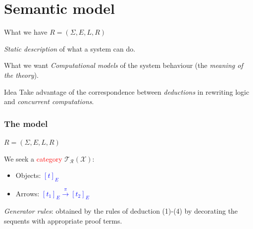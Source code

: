 \documentclass{beamer}
\begin{document}
\section{Semantic model}
\begin{frame}
    \begin{block}{What we have}
    $ R = (\Sigma, E, L, R)$

    \emph{Static description} of what a system can do.
        
    \end{block}
    
    \pause

    \begin{block}{What we want}
        \emph{Computational models} of the system behaviour (the \emph{meaning of the theory}).
    \end{block}

    \pause

    \begin{block}{Idea}
        Take advantage of the correspondence between  \emph{deductions} in rewriting logic 
        and \emph{concurrent computations}.
    \end{block}
\end{frame}
\begin{frame}
    \frametitle{The model }
    $
    R = (\Sigma, E, L, R)
    $

    \pause 
    \bigskip
    We seek a \textcolor{red}{category} $\mathcal{T_R(X)}$:\begin{itemize}
        \item Objects: \textcolor{blue}{$[t]_E$}
        \item Arrows: \textcolor{blue}{$[t_1]_E \xrightarrow{\pi} [t_2]_E$}
    \end{itemize}

    \pause 
    \bigskip
    \emph{Generator rules}: obtained by the rules of deduction (1)-(4) by decorating 
    the sequents with appropriate proof terms.
\end{frame}
\end{document}
